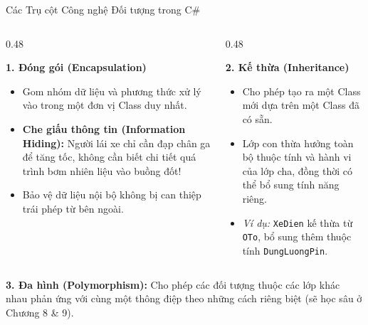 \documentclass[aspectratio=169, 10pt]{beamer}
\begin{document}
\begin{frame}{Các Trụ cột Công nghệ Đối tượng trong C\#}
  \begin{columns}[T]
    \begin{column}{0.48\textwidth}
      \begin{block}{\textbf{1. Đóng gói (Encapsulation)}}
        \begin{itemize}
          \item Gom nhóm dữ liệu và phương thức xử lý vào trong một đơn vị Class duy nhất.
          \item \textbf{Che giấu thông tin (Information Hiding):} Người lái xe chỉ cần đạp chân ga để tăng tốc, không cần biết chi tiết quá trình bơm nhiên liệu vào buồng đốt!
          \item Bảo vệ dữ liệu nội bộ không bị can thiệp trái phép từ bên ngoài.
        \end{itemize}
      \end{block}
    \end{column}
    \begin{column}{0.48\textwidth}
      \begin{block}{\textbf{2. Kế thừa (Inheritance)}}
        \begin{itemize}
          \item Cho phép tạo ra một Class mới dựa trên một Class đã có sẵn.
          \item Lớp con thừa hưởng toàn bộ thuộc tính và hành vi của lớp cha, đồng thời có thể bổ sung tính năng riêng.
          \item \textit{Ví dụ:} \texttt{XeDien} kế thừa từ \texttt{OTo}, bổ sung thêm thuộc tính \texttt{DungLuongPin}.
        \end{itemize}
      \end{block}
    \end{column}
  \end{columns}
  \vskip 2mm
  \begin{block}{\textbf{3. Đa hình (Polymorphism):}}
    Cho phép các đối tượng thuộc các lớp khác nhau phản ứng với cùng một thông điệp theo những cách riêng biệt (sẽ học sâu ở Chương 8 \& 9).
  \end{block}
\end{frame}
\end{document}
